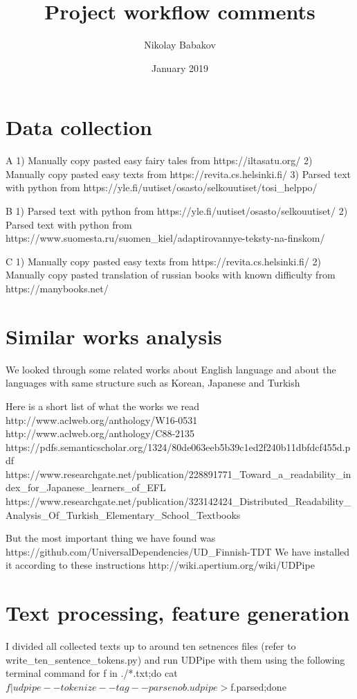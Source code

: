 \documentclass{article}
\title{Project workflow comments
}
\author{Nikolay Babakov
 }
\date{January 2019}
\begin{document}
\maketitle

\section{Data collection}
A
1) Manually copy pasted easy fairy tales from https://iltasatu.org/
2) Manually copy pasted easy texts from https://revita.cs.helsinki.fi/
3) Parsed text with python from https://yle.fi/uutiset/osasto/selkouutiset/tosi_helppo/

B
1) Parsed text with python from https://yle.fi/uutiset/osasto/selkouutiset/
2) Parsed text with python from https://www.suomesta.ru/suomen_kiel/adaptirovannye-teksty-na-finskom/

C
1) Manually copy pasted easy texts from https://revita.cs.helsinki.fi/
2) Manually copy pasted translation of russian books with known difficulty from https://manybooks.net/

\section{Similar works analysis}
We looked through some related works about English language and about the languages with same structure such as Korean, Japanese and Turkish

Here is a short list of what the works we read
http://www.aclweb.org/anthology/W16-0531
http://www.aclweb.org/anthology/C88-2135
https://pdfs.semanticscholar.org/1324/80de063eeb5b39c1ed2f240b11dbfdcf455d.pdf
https://www.researchgate.net/publication/228891771_Toward_a_readability_index_for_Japanese_learners_of_EFL
https://www.researchgate.net/publication/323142424_Distributed_Readability_Analysis_Of_Turkish_Elementary_School_Textbooks

But the most important thing we have found was https://github.com/UniversalDependencies/UD_Finnish-TDT
We have installed it according to these instructions http://wiki.apertium.org/wiki/UDPipe

\section{Text processing, feature generation}

I divided all collected texts up to around ten setnences files (refer to write_ten_sentence_tokens.py) and run UDPipe with them using the following terminal command
for f in ./*.txt;do cat $f | udpipe --tokenize --tag --parse nob.udpipe
 > $f.parsed;done
 
\end{document}
